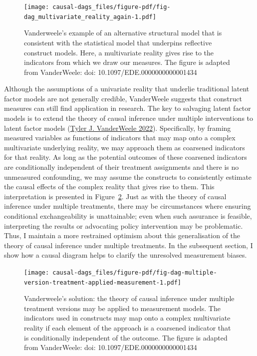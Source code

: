 \documentclass[
  singlecolumn]{report}
\begin{document}
\begin{figure}

{\centering \texttt{[image: causal-dags\_files/figure-pdf/fig-dag\_multivariate\_reality\_again-1.pdf]}

}

\caption{\label{fig-dag_multivariate_reality_again}Vanderweele's example
of an alternative structural model that is consistent with the
statistical model that underpins reflective construct models. Here, a
multivariate reality gives rise to the indicators from which we draw our
measures. The figure is adapted from VanderWeele: doi:
10.1097/EDE.0000000000001434}

\end{figure}

Although the assumptions of a univariate reality that underlie
traditional latent factor models are not generally credible, VanderWeele
suggests that construct measures can still find application in research.
The key to salvaging latent factor models is to extend the theory of
causal inference under multiple interventions to latent factor models
(\protect\hyperlink{ref-vanderweele2022}{Tyler J. VanderWeele 2022}).
Specifically, by framing measured variables as functions of indicators
that may map onto a complex multivariate underlying reality, we may
approach them as coarsened indicators for that reality. As long as the
potential outcomes of these coarsened indicators are conditionally
independent of their treatment assignments and there is no unmeasured
confounding, we may assume the constructs to consistently estimate the
causal effects of the complex reality that gives rise to them. This
interpretation is presented in
Figure~\ref{fig-dag-multiple-version-treatment-applied-measurement}.
Just as with the theory of causal inference under multiple treatments,
there may be circumstances where ensuring conditional exchangeability is
unattainable; even when such assurance is feasible, interpreting the
results or advocating policy intervention may be problematic. Thus, I
maintain a more restrained optimism about this generalisation of the
theory of causal inference under multiple treatments. In the subsequent
section, I show how a causal diagram helps to clarify the unresolved
measurement biases.

\begin{figure}

{\centering \texttt{[image: causal-dags\_files/figure-pdf/fig-dag-multiple-version-treatment-applied-measurement-1.pdf]}

}

\caption{\label{fig-dag-multiple-version-treatment-applied-measurement}Vanderweele's
solution: the theory of causal inference under multiple treatment
versions may be applied to measurement models. The indicators used in
constructs may map onto a complex multivariate reality if each element
of the approach is a coarsened indicator that is conditionally
independent of the outcome. The figure is adapted from VanderWeele: doi:
10.1097/EDE.0000000000001434}

\end{figure}
\end{document}
